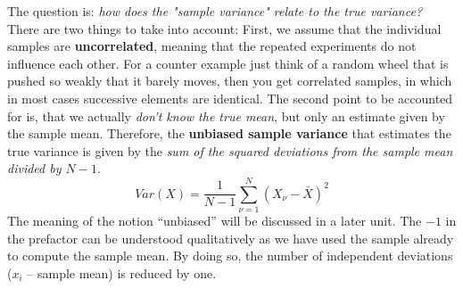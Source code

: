 \documentclass[12pt, a4paper]{scrartcl}
\begin{document}
The question is: \textit{how does the "sample variance" relate to the true variance?}
There are two things to take into account: 
First, we assume that the individual samples are \textbf{uncorrelated}, meaning that the repeated experiments do not influence each other. For a counter example just think of a random wheel that is pushed so weakly that it barely moves, then you get correlated samples, in which in most cases successive elements are identical.
The second point to be accounted for is, that we actually \textit{don't know the true mean}, but only an estimate given by the sample mean.
Therefore, the \textbf{unbiased sample variance} that estimates the true variance is given by the \textit{sum of the squared deviations from the sample mean divided by $N - 1$}.\\
\begin{equation*}\boxed{Var(X)=\frac{1}{N-1}\sum_{\nu = 1}^N(X_\nu-\bar{X})^2}\end{equation*}
The meaning of the notion ``unbiased'' will be discussed in a later unit.
The $-1$ in the prefactor can be understood qualitatively as we have used the sample already to compute the sample mean. By doing so, the number of independent deviations ($x_i$ – sample mean) is reduced by one.\\

\\
\end{document}
